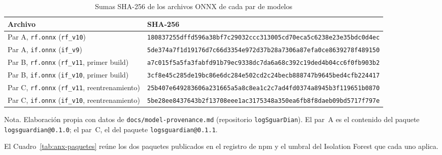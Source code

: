 \begin{table}[H]
\centering
\small
\begin{tabular}{|L{3.6cm}|L{9.9cm}|}
\hline
\textbf{Archivo} & \textbf{SHA-256} \\ \hline
Par A, \texttt{rf.onnx} (\texttt{rf\_v10}) & {\scriptsize\texttt{180837255dffd596a38bf7c29032ccc313005cd70eca5c6238e23e35bdc0d4ec}} \\ \hline
Par A, \texttt{if.onnx} (\texttt{if\_v9}) & {\scriptsize\texttt{5de374a7f1d19176d7c66d3354e972d37b28a7306a87efa0ce8639278f489150}} \\ \hline
Par B, \texttt{rf.onnx} (\texttt{rf\_v11}, primer build) & {\scriptsize\texttt{a7c015f5a5fa3fabfd91b79ec9338dc7da6a68c392c19ded4b04cc6f0fb903b2}} \\ \hline
Par B, \texttt{if.onnx} (\texttt{if\_v10}, primer build) & {\scriptsize\texttt{3cf8e45c285de19bc86e6dc284e502cd2c24becb888747b9645bed4cfb224417}} \\ \hline
Par C, \texttt{rf.onnx} (\texttt{rf\_v11}, reentrenamiento) & {\scriptsize\texttt{25b407e649283606a231665a5a8c8ea1c2c7ad4fd0374a8945b3f119651b0870}} \\ \hline
Par C, \texttt{if.onnx} (\texttt{if\_v10}, reentrenamiento) & {\scriptsize\texttt{5be28ee8437643b2f13708eee1ac3175348a350ea6fb8f8daeb09bd5717f797e}} \\ \hline
\end{tabular}
\caption[Sumas SHA-256 de los pares de modelos]{Sumas SHA-256 de los archivos ONNX de cada par de modelos}
\label{tab:anx-hashes}
\end{table}
{\footnotesize Nota. Elaboración propia con datos de \texttt{docs/model-provenance.md} (repositorio
\texttt{logSguarDian}). El par~A es el contenido del paquete \texttt{logsguardian@0.1.0}; el par~C,
el del paquete \texttt{logsguardian@0.1.1}.}

El Cuadro~\ref{tab:anx-paquetes} reúne los dos paquetes publicados en el registro de npm y el umbral
del Isolation Forest que cada uno aplica.

